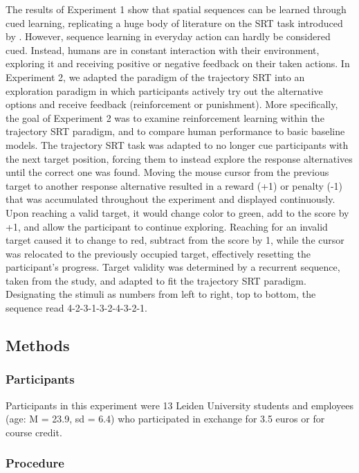 \documentclass[man,floatsintext]{apa6}
\begin{document}
The results of Experiment 1 show that spatial sequences can be learned through cued learning, replicating a huge body of literature on the SRT task introduced by . However, sequence learning in everyday action can hardly be considered cued. Instead, humans are in constant interaction with their environment, exploring it and receiving positive or negative feedback on their taken actions. In Experiment 2, we adapted the paradigm of the trajectory SRT into an exploration paradigm in which participants actively try out the alternative options and receive feedback (reinforcement or punishment). More specifically, the goal of Experiment 2 was to examine reinforcement learning within the trajectory SRT paradigm, and to compare human performance to basic baseline models. The trajectory SRT task was adapted to no longer cue participants with the next target position, forcing them to instead explore the response alternatives until the correct one was found. Moving the mouse cursor from the previous target to another response alternative resulted in a reward (+1) or penalty (-1) that was accumulated throughout the experiment and displayed continuously. Upon reaching a valid target, it would change color to green, add to the score by +1, and allow the participant to continue exploring. Reaching for an invalid target caused it to change to red, subtract from the score by 1, while the cursor was relocated to the previously occupied target, effectively resetting the participant's progress. Target validity was determined by a recurrent sequence, taken from the  study, and adapted to fit the trajectory SRT paradigm. Designating the stimuli as numbers from left to right, top to bottom, the sequence read 4-2-3-1-3-2-4-3-2-1.

\subsection{Methods}

\subsubsection{Participants}

Participants in this experiment were 13 Leiden University students and employees (age: M = 23.9, sd = 6.4) who participated in exchange for 3.5 euros or for course credit.

\subsubsection{Procedure}
 
\end{document}
